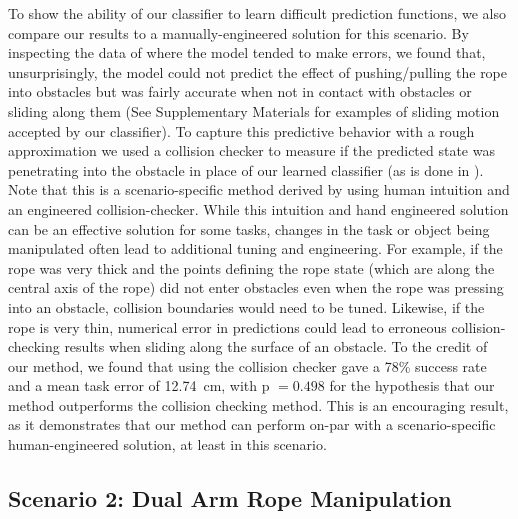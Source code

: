 To show the ability of our classifier to learn difficult prediction functions, we also compare our results to a manually-engineered solution for this scenario. By inspecting the data of where the model tended to make errors, we found that, unsurprisingly, the model could not predict the effect of pushing/pulling the rope into obstacles but was fairly accurate when not in contact with obstacles or sliding along them (See Supplementary Materials for examples of sliding motion accepted by our classifier). To capture this predictive behavior with a rough approximation we used a collision checker to measure if the predicted state was penetrating into the obstacle in place of our learned classifier (as is done in \cite{Lamiraux2001}). Note that this is a scenario-specific method derived by using human intuition and an engineered collision-checker. While this intuition and hand engineered solution can be an effective solution for some tasks, changes in the task or object being manipulated often lead to additional tuning and engineering. For example, if the rope was very thick and the points defining the rope state (which are along the central axis of the rope) did not enter obstacles even when the rope was pressing into an obstacle, collision boundaries would need to be tuned. Likewise, if the rope is very thin, numerical error in predictions could lead to erroneous collision-checking results when sliding along the surface of an obstacle. To the credit of our method, we found that using the collision checker gave a 78\% success rate and a mean task error of \SI{12.74}{\centi\meter}, with p $= 0.498$ for the hypothesis that our method outperforms the collision checking method. This is an encouraging result, as it demonstrates that our method can perform on-par with a scenario-specific human-engineered solution, at least in this scenario.

\subsection{Scenario 2: Dual Arm Rope Manipulation}


